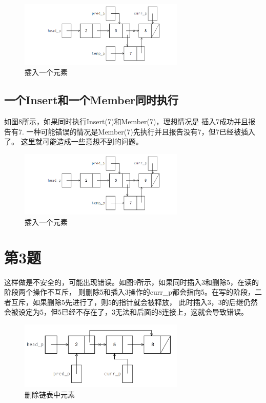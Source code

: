\documentclass[UTF8]{article}
\begin{document}
\begin{figure}[h]
   \centering
       \includegraphics[width=0.7\textwidth]{22.png}
       \caption{插入一个元素}
   \end{figure}

\subsection{一个Insert和一个Member同时执行}
如图8所示，如果同时执行Insert(7)和Member(7)，理想情况是
插入7成功并且报告有7.
一种可能错误的情况是Member(7)先执行并且报告没有7，但7已经被插入了。
这里就可能造成一些意想不到的问题。

\begin{figure}[h]
   \centering
       \includegraphics[width=0.7\textwidth]{22.png}
       \caption{插入一个元素}
   \end{figure}

\section{第3题}

这样做是不安全的，可能出现错误。如图9所示，如果同时插入3和删除5，在读的阶段两个操作不互斥，
则删除5和插入3操作的curr\_p都会指向5。在写的阶段，二者互斥，如果删除5先进行了，则5的指针就会被释放，
此时插入3，3的后继仍然会被设定为5，但5已经不存在了，3无法和后面的8连接上，这就会导致错误。

\begin{figure}[h]
   \centering
       \includegraphics[width=0.7\textwidth]{21.png}
       \caption{删除链表中元素}
   \end{figure}
\end{document}
